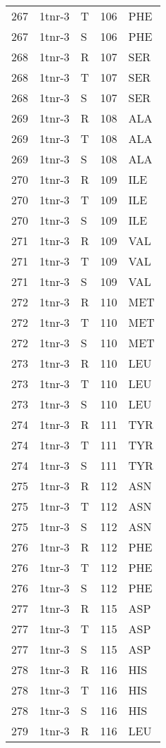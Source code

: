 \begin{tiny}
\begin{longtable}[l]{l|l|l|l|l}
	267 & 1tnr-3 & T & 106 & PHE \\
	267 & 1tnr-3 & S & 106 & PHE \\
	268 & 1tnr-3 & R & 107 & SER \\
	268 & 1tnr-3 & T & 107 & SER \\
	268 & 1tnr-3 & S & 107 & SER \\
	269 & 1tnr-3 & R & 108 & ALA \\
	269 & 1tnr-3 & T & 108 & ALA \\
	269 & 1tnr-3 & S & 108 & ALA \\
	270 & 1tnr-3 & R & 109 & ILE \\
	270 & 1tnr-3 & T & 109 & ILE \\
	270 & 1tnr-3 & S & 109 & ILE \\
	271 & 1tnr-3 & R & 109 & VAL \\
	271 & 1tnr-3 & T & 109 & VAL \\
	271 & 1tnr-3 & S & 109 & VAL \\
	272 & 1tnr-3 & R & 110 & MET \\
	272 & 1tnr-3 & T & 110 & MET \\
	272 & 1tnr-3 & S & 110 & MET \\
	273 & 1tnr-3 & R & 110 & LEU \\
	273 & 1tnr-3 & T & 110 & LEU \\
	273 & 1tnr-3 & S & 110 & LEU \\
	274 & 1tnr-3 & R & 111 & TYR \\
	274 & 1tnr-3 & T & 111 & TYR \\
	274 & 1tnr-3 & S & 111 & TYR \\
	275 & 1tnr-3 & R & 112 & ASN \\
	275 & 1tnr-3 & T & 112 & ASN \\
	275 & 1tnr-3 & S & 112 & ASN \\
	276 & 1tnr-3 & R & 112 & PHE \\
	276 & 1tnr-3 & T & 112 & PHE \\
	276 & 1tnr-3 & S & 112 & PHE \\
	277 & 1tnr-3 & R & 115 & ASP \\
	277 & 1tnr-3 & T & 115 & ASP \\
	277 & 1tnr-3 & S & 115 & ASP \\
	278 & 1tnr-3 & R & 116 & HIS \\
	278 & 1tnr-3 & T & 116 & HIS \\
	278 & 1tnr-3 & S & 116 & HIS \\
	279 & 1tnr-3 & R & 116 & LEU \\

\end{longtable}
\end{tiny}
